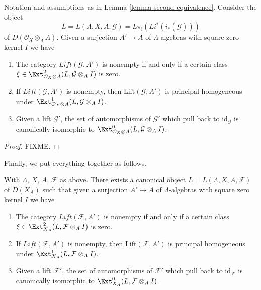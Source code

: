 \begin{lemma}
\label{lemma-second-equivalence-obs}
Notation and assumptions as in Lemma \ref{lemma-second-equivalence}.
Consider the object
$$
L = L(\Lambda, X, A, \mathcal{G}) = L\pi_!(Li^*(i_*(\underline{\mathcal{G}})))
$$
of $D(\mathcal{O}_X \otimes_\Lambda A)$. Given a surjection $A' \to A$ of
$\Lambda$-algebras with square zero kernel $I$ we have
\begin{enumerate}
\item The category $\textit{Lift}(\mathcal{G}, A')$ is nonempty
if and only if a certain class
$\xi \in \Ext^2_{\mathcal{O}_X \otimes A}(L, \mathcal{G} \otimes_A I)$
is zero.
\item If $\textit{Lift}(\mathcal{G}, A')$ is nonempty, then
$\text{Lift}(\mathcal{G}, A')$ is principal homogeneous under
$\Ext^1_{\mathcal{O}_X \otimes A}(L, \mathcal{G} \otimes_A I)$.
\item Given a lift $\mathcal{G}'$, the set of automorphisms of
$\mathcal{G}'$ which pull back to $\text{id}_\mathcal{G}$ is canonically
isomorphic to
$\Ext^0_{\mathcal{O}_X \otimes A}(L, \mathcal{G} \otimes_A I)$.
\end{enumerate}
\end{lemma}

\begin{proof}
FIXME.
\end{proof}

\noindent
Finally, we put everything together as follows.

\begin{proposition}
\label{proposition-conclusion}
With $\Lambda$, $X$, $A$, $\mathcal{F}$ as above. There exists a canonical
object $L = L(\Lambda, X, A, \mathcal{F})$ of $D(X_A)$ such that given a
surjection $A' \to A$ of $\Lambda$-algebras with square zero kernel $I$ we
have
\begin{enumerate}
\item The category $\textit{Lift}(\mathcal{F}, A')$ is nonempty
if and only if a certain class $\xi \in \Ext^2_{X_A}(L,
\mathcal{F} \otimes_A I)$ is zero.
\item If $\textit{Lift}(\mathcal{F}, A')$ is nonempty, then
$\text{Lift}(\mathcal{F}, A')$ is principal homogeneous under
$\Ext^1_{X_A}(L, \mathcal{F} \otimes_A I)$.
\item Given a lift $\mathcal{F}'$, the set of automorphisms of
$\mathcal{F}'$ which pull back to $\text{id}_\mathcal{F}$ is canonically
isomorphic to
$\Ext^0_{X_A}(L, \mathcal{F} \otimes_A I)$.
\end{enumerate}
\end{proposition}

